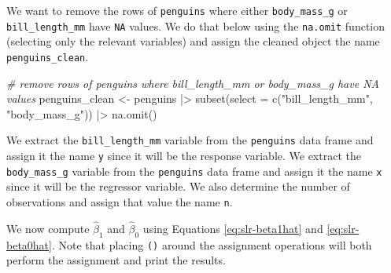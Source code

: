 \documentclass[
]{book}
\newenvironment{Shaded}{\begin{snugshade}}{\end{snugshade}}
\newcommand{\AttributeTok}[1]{\textcolor[rgb]{0.77,0.63,0.00}{#1}}
\newcommand{\CommentTok}[1]{\textcolor[rgb]{0.56,0.35,0.01}{\textit{#1}}}
\newcommand{\FunctionTok}[1]{\textcolor[rgb]{0.00,0.00,0.00}{#1}}
\newcommand{\NormalTok}[1]{#1}
\newcommand{\OtherTok}[1]{\textcolor[rgb]{0.56,0.35,0.01}{#1}}
\newcommand{\SpecialCharTok}[1]{\textcolor[rgb]{0.00,0.00,0.00}{#1}}
\newcommand{\StringTok}[1]{\textcolor[rgb]{0.31,0.60,0.02}{#1}}
\theoremstyle{definition}
\theoremstyle{definition}
\theoremstyle{definition}
\theoremstyle{definition}
\theoremstyle{remark}
\begin{document}
We want to remove the rows of \texttt{penguins} where either \texttt{body\_mass\_g} or \texttt{bill\_length\_mm} have \texttt{NA} values. We do that below using the \texttt{na.omit} function (selecting only the relevant variables) and assign the cleaned
object the name \texttt{penguins\_clean}.

\begin{Shaded}
\begin{Highlighting}[]
\CommentTok{\# remove rows of penguins where bill\_length\_mm or body\_mass\_g have NA values}
\NormalTok{penguins\_clean }\OtherTok{\textless{}{-}}
\NormalTok{  penguins }\SpecialCharTok{|\textgreater{}}
  \FunctionTok{subset}\NormalTok{(}\AttributeTok{select =} \FunctionTok{c}\NormalTok{(}\StringTok{"bill\_length\_mm"}\NormalTok{, }\StringTok{"body\_mass\_g"}\NormalTok{)) }\SpecialCharTok{|\textgreater{}}
  \FunctionTok{na.omit}\NormalTok{()}
\end{Highlighting}
\end{Shaded}

We extract the \texttt{bill\_length\_mm} variable from the \texttt{penguins} data frame and assign it the name \texttt{y} since it will be the response variable. We extract the \texttt{body\_mass\_g} variable from the \texttt{penguins} data frame and
assign it the name \texttt{x} since it will be the regressor variable. We also determine the number of observations and assign that value the name \texttt{n}.

\begin{Shaded}
\end{Shaded}

We now compute \(\hat{\beta}_1\) and \(\hat{\beta}_0\) using Equations \eqref{eq:slr-beta1hat} and \eqref{eq:slr-beta0hat}. Note that placing \texttt{()} around the assignment operations will both perform the assignment and print the results.
\end{document}
